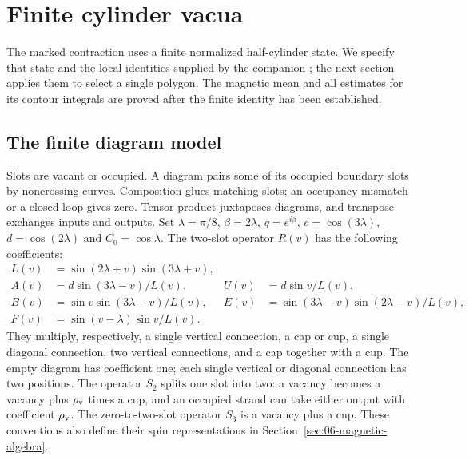 \section{Finite cylinder vacua}
\label{sec:reference}

The marked contraction uses a finite normalized half-cylinder state.
We specify that state and the local identities supplied by the companion
\cite{Electric}; the next section applies them to select a single polygon.
The magnetic mean and all estimates for its contour integrals are proved
after the finite identity has been established.

\subsection{The finite diagram model}

Slots are vacant or occupied. A diagram pairs some of its occupied
boundary slots by noncrossing curves. Composition glues matching slots;
an occupancy mismatch or a closed loop gives zero. Tensor product
juxtaposes diagrams, and transpose exchanges inputs and outputs.
Set $\lambda=\pi/8$, $\beta=2\lambda$, $q=e^{i\beta}$,
$c=\cos(3\lambda)$, $d=\cos(2\lambda)$ and $C_0=\cos\lambda$.
The two-slot operator $R(v)$ has the following coefficients:
\[
\begin{aligned}
 L(v)&=\sin(2\lambda+v)\sin(3\lambda+v),\\
 A(v)&=d\sin(3\lambda-v)/L(v),&
 U(v)&=d\sin v/L(v),\\
 B(v)&=\sin v\sin(3\lambda-v)/L(v),&
 E(v)&=\sin(3\lambda-v)\sin(2\lambda-v)/L(v),\\
 F(v)&=\sin(v-\lambda)\sin v/L(v).
\end{aligned}
\]
They multiply, respectively, a single vertical connection, a cap or
cup, a single diagonal connection, two vertical connections, and a
cap together with a cup. The empty diagram has coefficient one; each
single vertical or diagonal connection has two positions. The operator
$S_2$ splits one slot into two: a vacancy becomes a vacancy plus
$\rho_{\rm v}$ times a cup, and an occupied strand can take either
output with coefficient $\rho_{\rm v}$. The zero-to-two-slot operator
$S_3$ is a vacancy plus a cup. These conventions also define their
spin representations in Section~\ref{sec:06-magnetic-algebra}.

